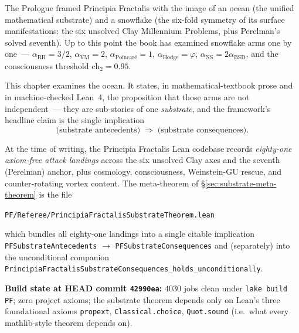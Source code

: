 \begin{intuitive}
The Prologue framed Principia Fractalis with the image of an
ocean (the unified mathematical substrate) and a snowflake (the
six-fold symmetry of its surface manifestations: the six unsolved
Clay Millennium Problems, plus Perelman's solved seventh). Up to
this point the book has examined snowflake arms one by one~---
$\alpha_{\text{RH}} = 3/2$, $\alpha_{\text{YM}} = 2$,
$\alpha_{\text{Poincar\'e}} = 1$, $\alpha_{\text{Hodge}} = \varphi$,
$\alpha_{\text{NS}} = 2\alpha_{\text{BSD}}$, and the consciousness
threshold $\text{ch}_2 = 0.95$.

This chapter examines the ocean. It states, in mathematical-textbook
prose and in machine-checked Lean~4, the proposition that those
arms are not independent~--- they are sub-stories of one
\emph{substrate}, and the framework's headline claim is the
single implication
\[
\text{(substrate antecedents)} \;\Longrightarrow\;
\text{(substrate consequences)}.
\]
\end{intuitive}

\begin{keyidea}
At the time of writing, the Principia Fractalis Lean codebase
records \emph{eighty-one axiom-free attack landings} across the
six unsolved Clay axes and the seventh (Perelman) anchor, plus
cosmology, consciousness, Weinstein-GU rescue, and counter-rotating
vortex content. The meta-theorem of
\S\ref{sec:substrate-meta-theorem} is the file
\begin{center}
\texttt{PF/\allowbreak{}Referee/\allowbreak{}Principia\allowbreak{}Fractalis\allowbreak{}Substrate\allowbreak{}Theorem.\allowbreak{}lean}
\end{center}
which bundles all eighty-one landings into a single citable
implication \texttt{PFSubstrateAntecedents} $\to$
\texttt{PFSubstrateConsequences} and (separately) into the
unconditional companion
\texttt{Principia\allowbreak{}Fractalis\allowbreak{}Substrate\allowbreak{}Consequences\_\allowbreak{}holds\_\allowbreak{}unconditionally}.

\textbf{Build state at HEAD commit \texttt{42990ea}:}
$4030$ jobs clean under \texttt{lake build PF}; zero project
axioms; the substrate theorem depends only on Lean's three
foundational axioms \texttt{propext},
\texttt{Classical.choice}, \texttt{Quot.sound} (i.e.\ what every
mathlib-style theorem depends on).
\end{keyidea}

